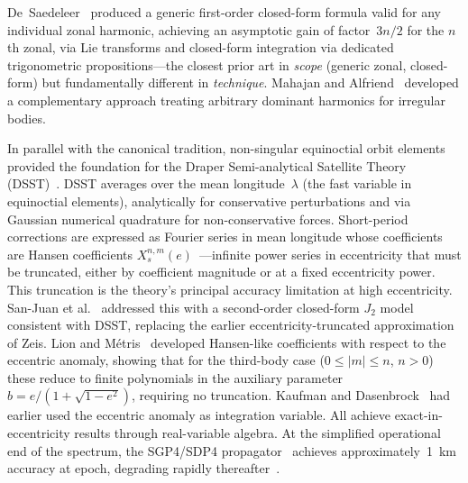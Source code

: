 De~Saedeleer~\cite{desaedeleer2005} produced a generic first-order
closed-form formula valid for any individual zonal harmonic, achieving an
asymptotic gain of factor~$3n/2$ for the $n$th zonal, via Lie transforms
and closed-form integration via dedicated trigonometric
propositions---the closest prior art in \emph{scope}
(generic zonal, closed-form) but fundamentally different in
\emph{technique}.  Mahajan and Alfriend~\cite{mahajan2019} developed a
complementary approach treating arbitrary dominant harmonics for
irregular bodies.

In parallel with the canonical tradition, non-singular equinoctial orbit
elements~\cite{broucke1972,walker1985} provided the foundation for the
Draper Semi-analytical Satellite Theory
(DSST)~\cite{cefola1972,danielson1995}.  DSST averages over the mean
longitude~$\lambda$ (the fast variable in equinoctial elements),
analytically for conservative perturbations and via Gaussian numerical
quadrature for non-conservative forces.  Short-period corrections are
expressed as Fourier series in mean longitude whose coefficients are Hansen
coefficients $X_s^{n,m}(e)$~\cite{giacaglia1976}---infinite power series
in eccentricity that must be truncated, either by coefficient magnitude or
at a fixed eccentricity power.  This truncation is the theory's principal
accuracy limitation at high eccentricity.
San-Juan et al.~\cite{sanjuan2022} addressed this with a second-order
closed-form $J_2$ model consistent with DSST, replacing the earlier
eccentricity-truncated approximation of Zeis.  Lion and
M\'etris~\cite{lion2013} developed Hansen-like coefficients with respect
to the eccentric anomaly, showing that for the third-body case
($0 \leq |m| \leq n$, $n > 0$) these reduce to finite polynomials in
the auxiliary parameter $b = e/(1+\sqrt{1-e^2})$, requiring no
truncation.  Kaufman and Dasenbrock~\cite{kaufman1973} had earlier used
the eccentric anomaly as integration variable.  All achieve
exact-in-eccentricity results through real-variable algebra.
At the simplified operational end of the spectrum, the SGP4/SDP4
propagator~\cite{spacetrack1980,vallado2006} achieves approximately~1~km
accuracy at epoch, degrading rapidly
thereafter~\cite{vallado2006}.

